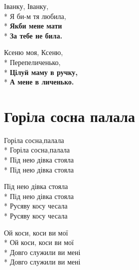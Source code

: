 \medskip

\begin{minipage}{\linewidth}
Іванку, Іванку,\\*
Я би-м тя любила,\\*
\textbf{Якби мене мати}\\*
\textbf{За тебе не била.}\\
\end{minipage}\par\medskip\nobreak

\medskip

\begin{minipage}{\linewidth}
Ксеню моя, Ксеню,\\*
Перепеличенько,\\*
\textbf{Цілуй маму в ручку,}\\*
\textbf{А мене в личенько.}\\
\end{minipage}

\vspace{\fill}\newpage

\section{Горіла сосна палала}
\label{song:Горіла_сосна_палала}

\medskip

\begin{minipage}{\linewidth}
Горіла сосна,палала\\*
Горіла сосна,палала\\*
Під нею дівка стояла\\*
Під нею дівка стояла\\
\end{minipage}\par\medskip\nobreak

\medskip

\begin{minipage}{\linewidth}
Під нею дівка стояла\\*
Під нею дівка стояла \\*
Русяву косу чесала\\*
Русяву косу чесала\\
\end{minipage}\par\medskip\nobreak

\medskip

\begin{minipage}{\linewidth}
Ой коси, коси ви мої\\*
Ой коси, коси ви мої\\*
Довго служили ви мені\\*
Довго служили ви мені\\
\end{minipage}\par\medskip\nobreak

